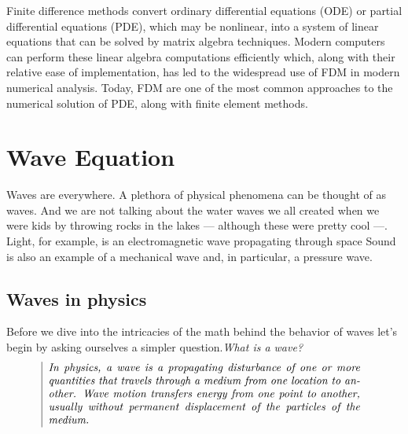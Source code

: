 \documentclass[oneside,hidelinks]{book}
\begin{document}
                Finite difference methods convert ordinary differential equations (ODE) or
                 partial differential equations (PDE), which may be nonlinear, into a system of
                linear equations that can be solved by matrix algebra techniques. Modern 
                computers can perform these linear algebra computations efficiently which,
                  along with their relative ease of implementation, has led to the widespread
                 use of FDM in modern numerical analysis. Today, FDM are one of the 
                 most common approaches to the numerical solution of PDE, along with 
                  finite element methods.
 
        \chapter{Wave Equation}
        Waves are everywhere. A plethora of physical phenomena can be thought of as waves. And we are not talking about the water waves we all created when we were kids by throwing rocks in the lakes — although these were pretty cool —. Light, for example, is an electromagnetic wave propagating through space Sound is also an 
        example of a mechanical wave and, in particular, a pressure wave.
                \section{Waves in physics}
                Before we dive into the intricacies of the math behind the behavior
                 of waves let's begin by asking ourselves a simpler question.\emph{What is a wave?}\\
                \begin{align*}
                \begin{tabular}{|p{10cm}}
                \emph{In physics, a wave is a propagating disturbance of one or more quantities that travels through a medium from one location to another. Wave motion transfers energy from one point to another, usually without permanent displacement of the particles of the medium.}
                \end{tabular}\\
                \end{align*}
\end{document}
